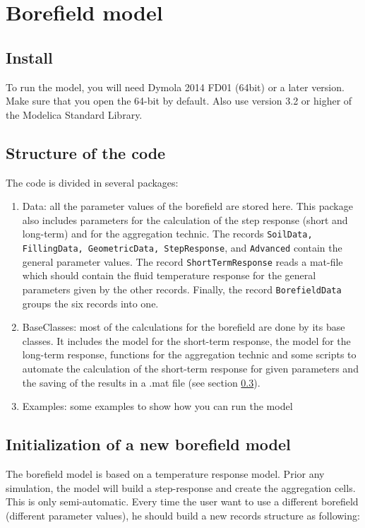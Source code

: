\documentclass[a4paper,oneside,11pt]{report}
\begin{document}
\chapter*{Borefield model}

\section{Install}
To run the model, you will need Dymola 2014 FD01 (64bit) or a later version. Make sure that you open the 64-bit by default. Also use version 3.2 or higher of the Modelica Standard Library.

\section{Structure of the code}
The code is divided in several packages:
\begin{enumerate}
\item Data: all the parameter values of the borefield are stored here. This package also includes parameters for the calculation of the step response (short and long-term) and for the aggregation technic. The records {\tt SoilData, FillingData, GeometricData, StepResponse}, and {\tt Advanced} contain the general parameter values. The record {\tt ShortTermResponse} reads a mat-file which should contain the fluid temperature response for the general parameters given by the other records. Finally, the record {\tt BorefieldData} groups the six records into one. 
\item BaseClasses: most of the calculations for the borefield are done by its base classes. It includes the model for the short-term response, the model for the long-term response, functions for the aggregation technic and some scripts to automate the calculation of the short-term response for given parameters and the saving of the results in a .mat file (see section \ref{sec:ini_mod}).
\item Examples: some examples to show how you can run the model
\end{enumerate}


\section{Initialization of a new borefield model} \label{sec:ini_mod}
The borefield model is based on a temperature response model. Prior any simulation, the model will build a step-response and create the aggregation cells. This is only semi-automatic. Every time the user want to use a different borefield (different parameter values), he should build a new records structure as following:
\end{document}
